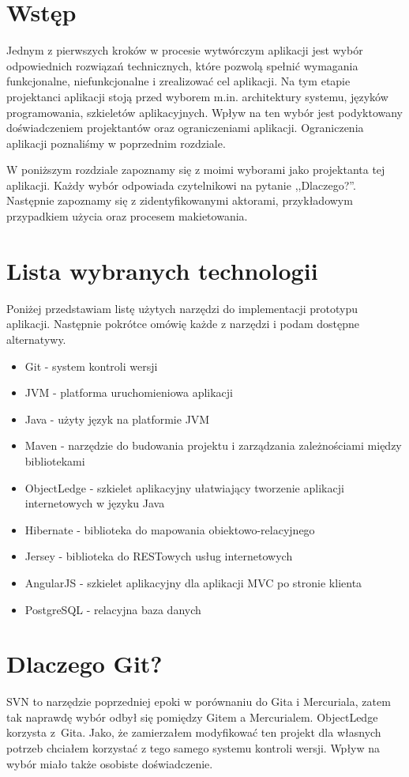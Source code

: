 \documentclass[a4paper,onecolumn,oneside,11pt,wide,floatssmall]{mwrep}
\theoremstyle{definition}
\theoremstyle{plain}%
\theoremstyle{remark}
\begin{document}
\section{Wstęp}
Jednym z pierwszych kroków w procesie wytwórczym aplikacji jest wybór odpowiednich rozwiązań technicznych, które pozwolą spełnić wymagania funkcjonalne, niefunkcjonalne i zrealizować cel aplikacji. Na tym etapie projektanci aplikacji stoją przed wyborem m.in. architektury systemu, języków programowania, szkieletów aplikacyjnych. Wpływ na ten wybór jest podyktowany doświadczeniem projektantów oraz ograniczeniami aplikacji. Ograniczenia aplikacji poznaliśmy w poprzednim rozdziale.

W poniższym rozdziale zapoznamy się z moimi wyborami jako projektanta tej aplikacji. Każdy wybór odpowiada czytelnikowi na pytanie ,,Dlaczego?''. Następnie zapoznamy się z zidentyfikowanymi aktorami, przykładowym przypadkiem użycia oraz procesem makietowania.

\section{Lista wybranych technologii}
Poniżej przedstawiam listę użytych narzędzi do implementacji prototypu aplikacji. Następnie pokrótce omówię każde z narzędzi i podam dostępne alternatywy.

\begin{itemize}
  \item Git - system kontroli wersji
  \item JVM - platforma uruchomieniowa aplikacji
  \item Java - użyty język na platformie JVM
  \item Maven - narzędzie do budowania projektu i zarządzania zależnościami między bibliotekami
  \item ObjectLedge - szkielet aplikacyjny ułatwiający tworzenie aplikacji internetowych w języku Java
  \item Hibernate - biblioteka do mapowania obiektowo-relacyjnego
  \item Jersey - biblioteka do RESTowych usług internetowych
  \item AngularJS - szkielet aplikacyjny dla aplikacji MVC po stronie klienta
  \item PostgreSQL - relacyjna baza danych
\end{itemize}

\section{Dlaczego Git?}
SVN to narzędzie poprzedniej epoki w porównaniu do Gita i Mercuriala, zatem tak naprawdę wybór odbył się
pomiędzy Gitem a Mercurialem. ObjectLedge korzysta \mbox{z Gita}. Jako, że zamierzałem modyfikować ten projekt dla własnych 
potrzeb chciałem korzystać z tego samego systemu kontroli wersji. Wpływ na wybór miało także osobiste doświadczenie.
\end{document}

